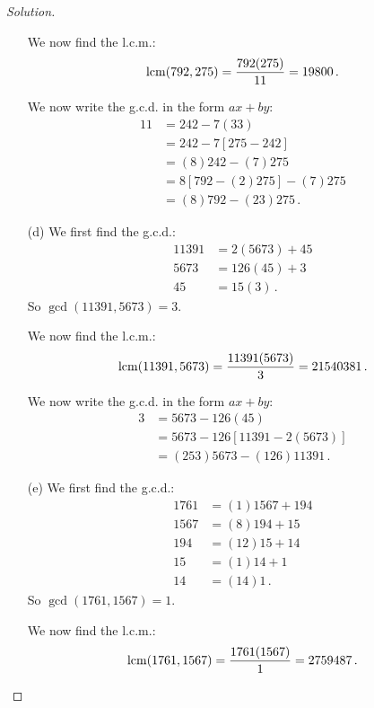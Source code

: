 \begin{proof}[Solution]
\begin{enumerate}
			We now find the l.c.m.:
			\[
				\operatorname{lcm}(792,275) = \frac{792(275)}{11} = 19800\,.
			\]
			
			We now write the g.c.d. in the form $ax + by$:
			\begin{align*}
				11 &= 242 - 7(33) \\
					&= 242 - 7[275 - 242] \\
					&= (8)242 - (7)275 \\
					&= 8[792 - (2)275] - (7)275 \\
					&= (8)792 - (23)275\,.
			\end{align*}
		\item[(d)] We first find the g.c.d.:
			\begin{align*}
				11391 &= 2(5673) + 45 \\
				5673 &= 126(45) + 3 \\
				45 &= 15(3)\,.
			\end{align*}
			So $\gcd(11391,5673) = 3$.
			
			We now find the l.c.m.:
			\[
				\operatorname{lcm}(11391,5673) = \frac{11391(5673)}{3} = 21540381\,.
			\]
			
			We now write the g.c.d. in the form $ax + by$:
			\begin{align*}
				3 &= 5673 - 126(45) \\
					&= 5673 - 126[11391 - 2(5673)] \\
					&= (253)5673 - (126)11391\,.
			\end{align*}
		\item[(e)] We first find the g.c.d.:
			\begin{align*}
				1761 &= (1)1567 + 194 \\
				1567 &= (8)194 + 15 \\
				194 &= (12)15 + 14 \\
				15 &= (1)14 + 1 \\
				14 &= (14)1\,.
			\end{align*}
			So $\gcd(1761,1567) = 1$.
			
			We now find the l.c.m.:
			\[
				\operatorname{lcm}(1761,1567) = \frac{1761(1567)}{1} = 2759487\,.
			\]
			

\end{enumerate}
\end{proof}
